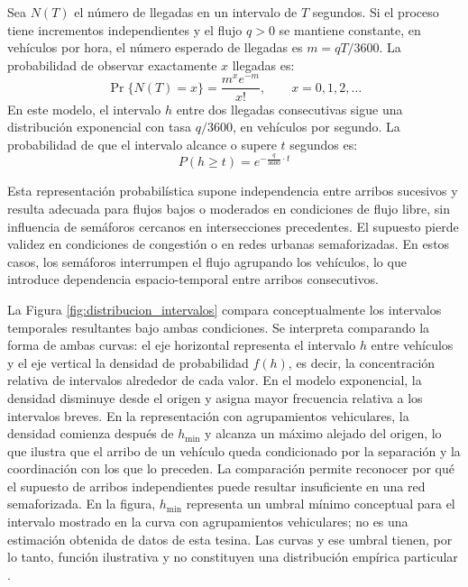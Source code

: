 Sea $N(T)$ el número de llegadas en un intervalo de $T$ segundos. Si el proceso tiene incrementos independientes y el flujo $q>0$ se mantiene constante, en vehículos por hora, el número esperado de llegadas es $m=qT/3600$. La probabilidad de observar exactamente $x$ llegadas es:
\begin{equation}
    \Pr\{N(T)=x\} = \frac{m^x e^{-m}}{x!}, \qquad x=0,1,2,\ldots
    \label{eq:proceso_poisson}
\end{equation}
En este modelo, el intervalo $h$ entre dos llegadas consecutivas sigue una distribución exponencial con tasa $q/3600$, en vehículos por segundo. La probabilidad de que el intervalo alcance o supere $t$ segundos es:
\begin{equation}
    P(h \ge t) = e^{-\frac{q}{3600} \cdot t}
    \label{eq:intervalo_exponencial}
\end{equation}

Esta representación probabilística supone independencia entre arribos sucesivos y resulta adecuada para flujos bajos o moderados en condiciones de flujo libre, sin influencia de semáforos cercanos en intersecciones precedentes. El supuesto pierde validez en condiciones de congestión o en redes urbanas semaforizadas. En estos casos, los semáforos interrumpen el \gls{flujo} agrupando los vehículos, lo que introduce dependencia espacio-temporal entre arribos consecutivos.

La Figura \ref{fig:distribucion_intervalos} compara conceptualmente los intervalos temporales resultantes bajo ambas condiciones. Se interpreta comparando la forma de ambas curvas: el eje horizontal representa el intervalo $h$ entre vehículos y el eje vertical la densidad de probabilidad $f(h)$, es decir, la concentración relativa de intervalos alrededor de cada valor. En el modelo exponencial, la densidad disminuye desde el origen y asigna mayor frecuencia relativa a los intervalos breves. En la representación con agrupamientos vehiculares, la densidad comienza después de $h_{\min}$ y alcanza un máximo alejado del origen, lo que ilustra que el arribo de un vehículo queda condicionado por la separación y la coordinación con los que lo preceden. La comparación permite reconocer por qué el supuesto de arribos independientes puede resultar insuficiente en una red semaforizada. En la figura, $h_{\min}$ representa un umbral mínimo conceptual para el intervalo mostrado en la curva con agrupamientos vehiculares; no es una estimación obtenida de datos de esta tesina. Las curvas y ese umbral tienen, por lo tanto, función ilustrativa y no constituyen una distribución empírica particular \cite{calymayor}.

